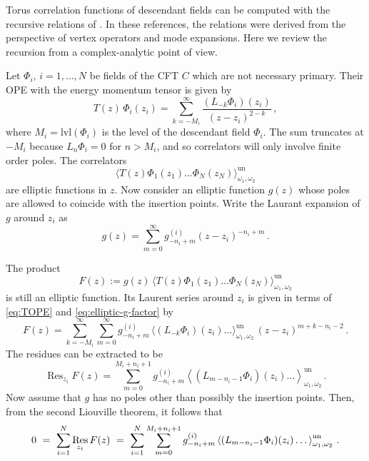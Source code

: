 \documentclass[11pt,a4paper]{article}
\numberwithin{equation}{section}
\DeclareMathOperator{\Res}{Res}
\begin{document}
Torus correlation functions of descendant fields can be computed with the recursive relations of \cite{Zhu:1996,Gaberdiel:2008pr,Gaberdiel:2012yb}. In these references, the relations were derived from the perspective of vertex operators and mode expansions. Here we review the recursion from a complex-analytic point of view.

\medskip

Let $\Phi_i$, $i=1,\dots,N$ be fields of the CFT $C$ which are not necessary primary. Their OPE with the energy momentum tensor is given by 
%
\begin{equation}\label{eq:TOPE}
    T(z)\,\Phi_i(z_i) = \sum_{k=-M_i}^\infty
\frac{(L_{-k}\Phi_i)(z_i)}{(z-z_i)^{2-k}}\,,
\end{equation}
where $M_i = \text{lvl}(\Phi_i)$ is the level of the descendant field $\Phi_i$. 
The sum truncates at $-M_i$ because $L_n \Phi_i=0$ for $n > M_i$, and so correlators will only involve
finite order poles.
The correlators 
\begin{equation}
    \big\langle T(z) \Phi_1(z_1) \dots \Phi_N(z_N)\big\rangle_{\omega_1,\omega_2}^\mathrm{un} 
\end{equation}
%
are elliptic functions in $z$. Now consider an elliptic function $g(z)$ whose poles are allowed to coincide with the insertion points. Write the Laurant expansion of $g$ around $z_i$ as
%
\begin{equation}\label{eq:elliptic-g-factor}
    g(z) = \sum_{m=0}^\infty g_{-n_i+m}^{(i)} (z-z_i)^{-n_i +m}\,.
\end{equation}

\noindent 
The product
%
\begin{equation}
    F(z) := g(z) \, \big\langle T(z) \Phi_1(z_1) \dots \Phi_N(z_N)\big\rangle_{\omega_1,\omega_2}^\mathrm{un}
\end{equation}
%
is still an elliptic function. Its Laurent series around $z_i$ is given in terms of \eqref{eq:TOPE} and \eqref{eq:elliptic-g-factor} by
\begin{equation}
   F(z) = \sum_{k=-M_i}^\infty \sum_{m=0}^\infty g_{-n_i+m}^{(i)}\,
    \big\langle(L_{-k}\Phi_i)(z_i)\dots\big\rangle_{\omega_1,\omega_2}^\mathrm{un} \,(z-z_i)^{m+k-n_i-2}\,.
\end{equation}
%
The residues can be extracted to be
%
\begin{equation}
    \Res_{z_i}F(z) = \sum_{m=0}^{M_i+n_i+1} g_{-n_i+m}^{(i)} 
    \left\langle (L_{m-n_i-1}\Phi_i)(z_i)\dots\right\rangle_{\omega_1,\omega_2}^\mathrm{un}\,.
\end{equation}
%
Now assume that $g$ has no poles other than possibly the insertion points. Then, from the second Liouville theorem, it follows that
%
\begin{equation}\label{eq:master1}
0 ~=~ \sum_{i=1}^N \Res_{z_i}F(z) \\
~=~ \sum_{i=1}^N \sum_{m=0}^{M_i+n_i+1} g_{-n_i+m}^{(i)} \left\langle (L_{m-n_i-1}\Phi_i)(z_i)\dots\right\rangle_{\omega_1,\omega_2}^\mathrm{un}\,.    
\end{equation}
\end{document}
